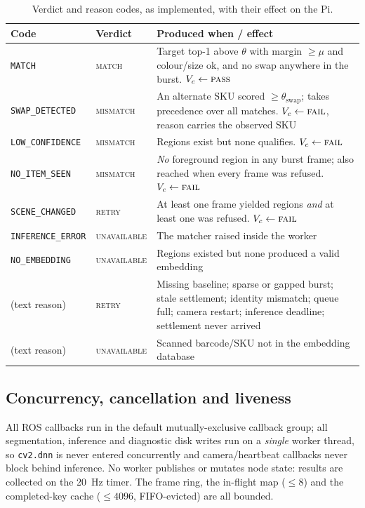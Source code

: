 \documentclass[conference]{IEEEtran}
\begin{document}
\begin{table}[!t]
\caption{Verdict and reason codes, as implemented, with their effect on the Pi.}
\label{tab:codes}
\centering
\footnotesize
\renewcommand{\arraystretch}{1.2}
\begin{tabular}{@{}p{}p{}p{}@{}}
\toprule
Code & Verdict & Produced when / effect \\
\midrule
\texttt{MATCH} & \textsc{match} & Target top-1 above $\theta$ with margin $\ge\mu$ and colour/size
  ok, and no swap anywhere in the burst. $V_c\gets\textsc{pass}$ \\
\texttt{SWAP\_DETECTED} & \textsc{mismatch} & An alternate SKU scored $\ge\theta_{\mathrm{swap}}$;
  takes precedence over all matches. $V_c\gets\textsc{fail}$, reason carries the observed SKU \\
\texttt{LOW\_CONFIDENCE} & \textsc{mismatch} & Regions exist but none qualifies.
  $V_c\gets\textsc{fail}$ \\
\texttt{NO\_ITEM\_SEEN} & \textsc{mismatch} & \emph{No} foreground region in any burst frame; also
  reached when every frame was refused. $V_c\gets\textsc{fail}$ \\
\texttt{SCENE\_CHANGED} & \textsc{retry} & At least one frame yielded regions \emph{and} at least one
  was refused. $V_c\gets\textsc{fail}$ \\
\texttt{INFERENCE\_ERROR} & \textsc{unavailable} & The matcher raised inside the worker \\
\texttt{NO\_EMBEDDING} & \textsc{unavailable} & Regions existed but none produced a valid embedding \\
(text reason) & \textsc{retry} & Missing baseline; sparse or gapped burst; stale settlement; identity
  mismatch; queue full; camera restart; inference deadline; settlement never arrived \\
(text reason) & \textsc{unavailable} & Scanned barcode/SKU not in the embedding database \\
\bottomrule
\end{tabular}
\end{table}

\subsection{Concurrency, cancellation and liveness}
All ROS callbacks run in the default mutually-exclusive callback group; all segmentation, inference
and diagnostic disk writes run on a \emph{single} worker thread, so \texttt{cv2.dnn} is never entered
concurrently and camera/heartbeat callbacks never block behind inference. No worker publishes or
mutates node state: results are collected on the 20~Hz timer. The frame ring, the in-flight map
($\le8$) and the completed-key cache ($\le4096$, FIFO-evicted) are all bounded.
\end{document}
